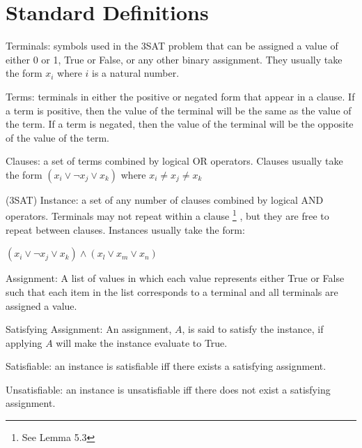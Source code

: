\documentclass[manuscript]{acmart}
\begin{document}
    \section{Standard Definitions}

    \begin{definition}
        Terminals: symbols used in the 3SAT problem that can be assigned a value
        of either 0 or 1, True or False, or any other binary assignment. They usually
        take the form $x_i$ where $i$ is a natural number.
    \end{definition}
    \begin{definition}
        Terms: terminals in either the positive or negated form that appear in a clause.
        If a term is positive, then the value of the terminal will be the 
        same as the value of the term. If a term is negated, then the value
        of the terminal will be the opposite of the value of the term.
    \end{definition}
    \begin{definition}
        Clauses: a set of terms combined by logical OR operators.
        Clauses usually take the form 
        $(x_i \lor \neg x_j \lor x_k)$ where $x_i \neq x_j \neq x_k$
    \end{definition}
    \begin{definition}
        (3SAT) Instance: a set of any number of clauses combined by logical
        AND operators. Terminals may not repeat within a clause
        \footnote{See Lemma 5.3}
        , but they are free to repeat between clauses. 
        Instances usually take the form:

        $(x_i \lor \neg x_j \lor x_k) \land (x_l \lor x_m \lor x_n)$
    \end{definition}
    \begin{definition}
        Assignment: A list of values in which each value represents either True
        or False such that each item in the list corresponds to a terminal and 
        all terminals are assigned a value.
    \end{definition}
    \begin{definition}
        Satisfying Assignment: An assignment, $A$, is said to satisfy the instance, 
        if applying $A$ will make the instance evaluate to True.
    \end{definition}
    \begin{definition}
        Satisfiable: an instance is satisfiable iff there exists a satisfying assignment.
    \end{definition}
    \begin{definition}
        Unsatisfiable: an instance is unsatisfiable iff there does not exist a satisfying assignment.
    \end{definition}
\end{document}
